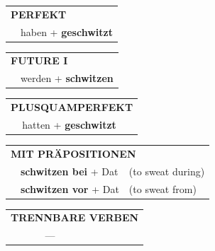 \documentclass[10pt,a4paper]{revtex4-2}
\begin{document}
\begin{verbbox}
\vspace{10pt}

\begin{tabular}{rl}
\multicolumn{2}{l}{\textbf{PERFEKT}}\\
& haben + \textbf{geschwitzt}\\
\end{tabular}
\hfill
\begin{tabular}{rl}
\multicolumn{2}{l}{\textbf{FUTURE I}}\\
& werden + \textbf{schwitzen}\\
\end{tabular}
\hfill
\begin{tabular}{rl}
\multicolumn{2}{l}{\textbf{PLUSQUAMPERFEKT}}\\
& hatten + \textbf{geschwitzt}\\
\end{tabular}

\vspace{10pt}

\begin{tabular}{lll}
\multicolumn{3}{l}{\textbf{MIT PRÄPOSITIONEN}}\\
& \textbf{schwitzen bei} + Dat & (to sweat during)\\
& \textbf{schwitzen vor} + Dat & (to sweat from)\\
\end{tabular}
\hfill
\begin{tabular}{lll}
\multicolumn{3}{l}{\textbf{TRENNBARE VERBEN}}\\
& ---\\
\end{tabular}

\vspace{-5pt}

\end{verbbox}
\end{document}
